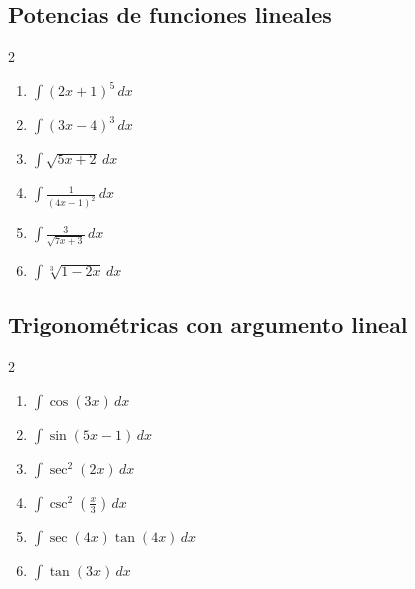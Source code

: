 \documentclass[12pt, letterpaper]{article}
\newcommand{\dx}{\,dx}
\begin{document}
\vspace{4pt}

\subsection{Potencias de funciones lineales}

\begin{multicols}{2}
\begin{enumerate}[label=\textbf{\arabic*.}, leftmargin=*, itemsep=10pt]

  \item \facil\quad $\displaystyle\int (2x+1)^5 \dx$

  \item \facil\quad $\displaystyle\int (3x-4)^3 \dx$

  \item \facil\quad $\displaystyle\int \sqrt{5x+2}\dx$

  \item \facil\quad $\displaystyle\int \frac{1}{(4x-1)^2}\dx$

  \item \medio\quad $\displaystyle\int \frac{3}{\sqrt{7x+3}}\dx$

  \item \medio\quad $\displaystyle\int \sqrt[3]{1-2x}\dx$

\end{enumerate}
\end{multicols}

\subsection{Trigonométricas con argumento lineal}

\begin{multicols}{2}
\begin{enumerate}[label=\textbf{\arabic*.}, leftmargin=*, itemsep=10pt, start=7]

  \item \facil\quad $\displaystyle\int \cos(3x)\dx$

  \item \facil\quad $\displaystyle\int \sin(5x-1)\dx$

  \item \facil\quad $\displaystyle\int \sec^2(2x)\dx$

  \item \medio\quad $\displaystyle\int \csc^2\!\left(\frac{x}{3}\right)\dx$

  \item \medio\quad $\displaystyle\int \sec(4x)\tan(4x)\dx$

  \item \medio\quad $\displaystyle\int \tan(3x)\dx$

\end{enumerate}
\end{multicols}
\end{document}
